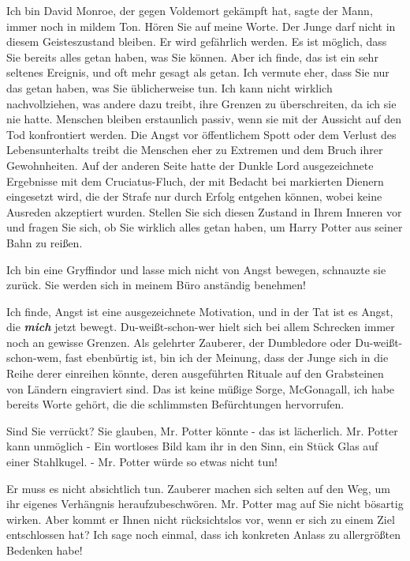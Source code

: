 \glqq{}Ich bin David Monroe, der gegen Voldemort gekämpft hat\grqq{}, sagte der
Mann, immer noch in mildem Ton. \glqq{}Hören Sie auf meine Worte. Der Junge darf
nicht in diesem Geisteszustand bleiben. Er wird gefährlich werden. Es ist
möglich, dass Sie bereits alles getan haben, was Sie können. Aber ich finde, das
ist ein sehr seltenes Ereignis, und oft mehr gesagt als getan. Ich vermute eher,
dass Sie nur das getan haben, was Sie üblicherweise tun. Ich kann nicht wirklich
nachvollziehen, was andere dazu treibt, ihre Grenzen zu überschreiten, da ich
sie nie hatte. Menschen bleiben erstaunlich passiv, wenn sie mit der Aussicht
auf den Tod konfrontiert werden. Die Angst vor öffentlichem Spott oder dem
Verlust des Lebensunterhalts treibt die Menschen eher zu Extremen und dem Bruch
ihrer Gewohnheiten. Auf der anderen Seite hatte der Dunkle Lord ausgezeichnete
Ergebnisse mit dem Cruciatus-Fluch, der mit Bedacht bei markierten Dienern
eingesetzt wird, die der Strafe nur durch Erfolg entgehen können, wobei keine
Ausreden akzeptiert wurden. Stellen Sie sich diesen Zustand in Ihrem Inneren vor
und fragen Sie sich, ob Sie wirklich alles getan haben, um Harry Potter aus
seiner Bahn zu reißen.\grqq{}

\glqq{}Ich bin eine Gryffindor und lasse mich nicht von Angst bewegen\grqq{},
schnauzte sie zurück. \glqq{}Sie werden sich in meinem Büro anständig
benehmen!\grqq{}

\glqq{}Ich finde, Angst ist eine ausgezeichnete Motivation, und in der Tat ist es
Angst, die \textbf{\emph{mich}} jetzt bewegt. Du-weißt-schon-wer hielt sich bei
allem Schrecken immer noch an gewisse Grenzen. Als gelehrter Zauberer, der
Dumbledore oder Du-weißt-schon-wem, fast ebenbürtig ist, bin ich der Meinung,
dass der Junge sich in die Reihe derer einreihen könnte, deren ausgeführten
Rituale auf den Grabsteinen von Ländern eingraviert sind. Das ist keine müßige
Sorge, McGonagall, ich habe bereits Worte gehört, die die schlimmsten
Befürchtungen hervorrufen.\grqq{}

\glqq{}Sind Sie verrückt? Sie glauben, Mr. Potter könnte - das ist lächerlich.
Mr. Potter kann unmöglich -\grqq{} Ein wortloses Bild kam ihr in den Sinn, ein
Stück Glas auf einer Stahlkugel. \glqq{}- Mr. Potter würde so etwas nicht
tun!\grqq{}

\glqq{}Er muss es nicht absichtlich tun. Zauberer machen sich selten auf den Weg,
um ihr eigenes Verhängnis heraufzubeschwören. Mr. Potter mag auf Sie nicht
bösartig wirken. Aber kommt er Ihnen nicht rücksichtslos vor, wenn er sich zu
einem Ziel entschlossen hat? Ich sage noch einmal, dass ich konkreten Anlass zu
allergrößten Bedenken habe!\grqq{}

